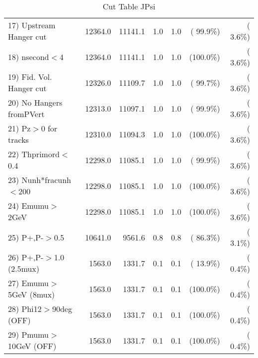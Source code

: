 \begin{table}[h!]
\begin{tabular}{||l||r|r|r|r|r|r||}
 17) Upstream Hanger cut  &      12364.0 &      11141.1 &          1.0 &          1.0 & ( 99.9\%) & (  3.6\%) \\
 18) nsecond$<$4          &      12364.0 &      11141.1 &          1.0 &          1.0 & (100.0\%) & (  3.6\%) \\
 19) Fid. Vol. Hanger cut &      12326.0 &      11109.7 &          1.0 &          1.0 & ( 99.7\%) & (  3.6\%) \\
 20) No Hangers fromPVert &      12313.0 &      11097.1 &          1.0 &          1.0 & ( 99.9\%) & (  3.6\%) \\
 21) Pz$>$0 for tracks    &      12310.0 &      11094.3 &          1.0 &          1.0 & (100.0\%) & (  3.6\%) \\
 22) Thprimord$<$0.4      &      12298.0 &      11085.1 &          1.0 &          1.0 & ( 99.9\%) & (  3.6\%) \\
 23) Nunh*fracunh$<$200   &      12298.0 &      11085.1 &          1.0 &          1.0 & (100.0\%) & (  3.6\%) \\
 24) Emumu$>$2GeV         &      12298.0 &      11085.1 &          1.0 &          1.0 & (100.0\%) & (  3.6\%) \\
 25) P+,P-$>$0.5          &      10641.0 &       9561.6 &          0.8 &          0.8 & ( 86.3\%) & (  3.1\%) \\
 26) P+,P-$>$1.0 (2.5mux) &       1563.0 &       1331.7 &          0.1 &          0.1 & ( 13.9\%) & (  0.4\%) \\
 27) Emumu$>$5GeV  (8mux) &       1563.0 &       1331.7 &          0.1 &          0.1 & (100.0\%) & (  0.4\%) \\
 28) Phi12$>$90deg  (OFF) &       1563.0 &       1331.7 &          0.1 &          0.1 & (100.0\%) & (  0.4\%) \\
 29) Pmumu$>$10GeV  (OFF) &       1563.0 &       1331.7 &          0.1 &          0.1 & (100.0\%) & (  0.4\%) \\
 \hline
 \hline
 \end{tabular}
 \caption{Cut Table  JPsi     }
 \label{tab-cutcohjpsi-mumu_jpsi}
 \end{table}
